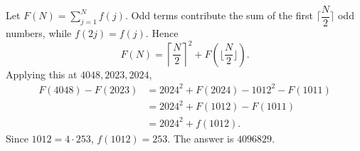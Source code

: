 Let $F(N)=\sum_{j=1}^N f(j)$. Odd terms contribute the sum of the first $\lceil \dfrac{N}{2}\rceil$ odd numbers, while $f(2j)=f(j)$. Hence
\[
F(N)=\left\lceil\dfrac{N}{2}\right\rceil^2+F(\lfloor \dfrac{N}{2}\rfloor).
\]
Applying this at $4048,2023,2024$,
\[
\begin{aligned}
F(4048)-F(2023)
&=2024^2+F(2024)-1012^2-F(1011)\\
&=2024^2+F(1012)-F(1011)\\
&=2024^2+f(1012).
\end{aligned}
\]
Since $1012=4\cdot253$, $f(1012)=253$. The answer is $\boxed{4096829}$.
